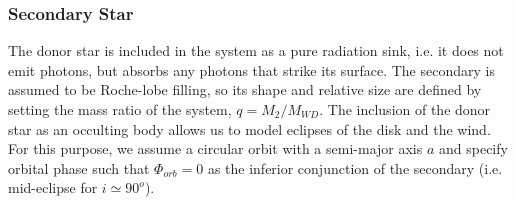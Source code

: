 \documentclass[preprint, a4paper, 11pt]{aastex}
\begin{document}
\subsubsection{Secondary Star}

The donor star is included in the system as a pure radiation sink, 
i.e. it does not emit photons, but absorbs any photons that strike its
surface. The secondary is assumed to be Roche-lobe filling, so its
shape and relative size are defined by setting the mass ratio of the system, 
$q = M_2/M_{WD}$. The inclusion of the donor star as an occulting body
allows us to model eclipses of the disk and the wind. For this
purpose, we assume a circular orbit with a semi-major axis $a$ and 
specify orbital phase such that $\Phi_{orb} = 0$ as the
inferior conjunction of the secondary (i.e. mid-eclipse for $i \simeq
90^o$).






%
%
\end{document}
